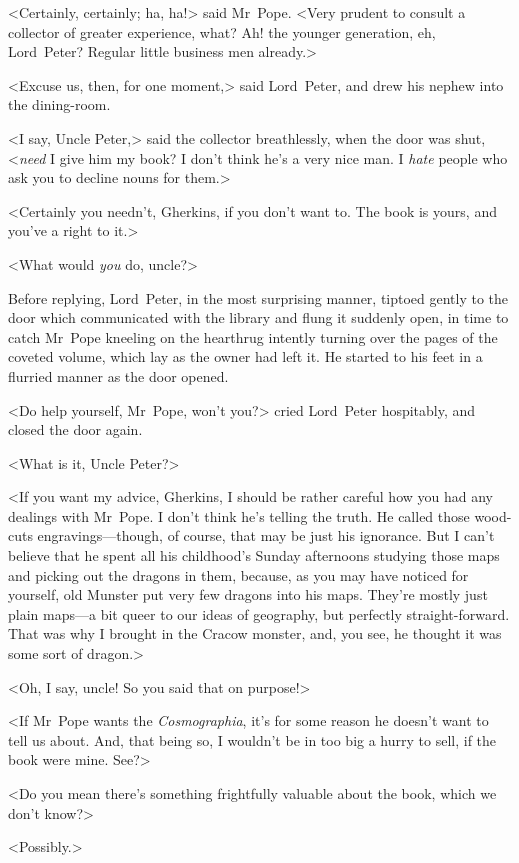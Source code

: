 <Certainly, certainly; ha, ha!> said Mr~Pope. <Very prudent to consult a collector of greater experience, what? Ah! the younger generation, eh, Lord~Peter? Regular little business men already.>

<Excuse us, then, for one moment,> said Lord~Peter, and drew his nephew into the dining-room.

<I say, Uncle Peter,> said the collector breathlessly, when the door was shut, <\textit{need} I give him my book? I don't think he's a very nice man. I \textit{hate} people who ask you to decline nouns for them.>

<Certainly you needn't, Gherkins, if you don't want to. The book is yours, and you've a right to it.>

<What would \textit{you} do, uncle?>

Before replying, Lord~Peter, in the most surprising manner, tiptoed gently to the door which communicated with the library and flung it suddenly open, in time to catch Mr~Pope kneeling on the hearthrug intently turning over the pages of the coveted volume, which lay as the owner had left it. He started to his feet in a flurried manner as the door opened.

<Do help yourself, Mr~Pope, won't you?> cried Lord~Peter hospitably, and closed the door again.

<What is it, Uncle Peter?>

<If you want my advice, Gherkins, I should be rather careful how you had any dealings with Mr~Pope. I don't think he's telling the truth. He called those wood-cuts engravings—though, of course, that may be just his ignorance. But I can't believe that he spent all his childhood's Sunday afternoons studying those maps and picking out the dragons in them, because, as you may have noticed for yourself, old Munster put very few dragons into his maps. They're mostly just plain maps—a bit queer to our ideas of geography, but perfectly straight-forward. That was why I brought in the Cracow monster, and, you see, he thought it was some sort of dragon.>

<Oh, I say, uncle! So you said that on purpose!>

<If Mr~Pope wants the \textit{Cosmographia}, it's for some reason he doesn't want to tell us about. And, that being so, I wouldn't be in too big a hurry to sell, if the book were mine. See?>

<Do you mean there's something frightfully valuable about the book, which we don't know?>

<Possibly.>

